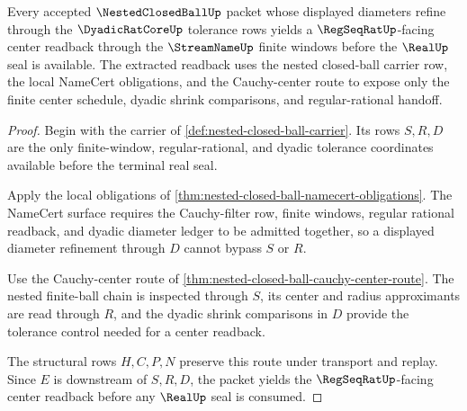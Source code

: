 \begin{theorem}
\label{thm:nestedclosedball-regseqrat-center-extraction}
Every accepted $\NestedClosedBallUp$ packet whose displayed diameters refine through the $\DyadicRatCoreUp$ tolerance rows yields a $\RegSeqRatUp$-facing center readback through the $\StreamNameUp$ finite windows before the $\RealUp$ seal is available. The extracted readback uses the nested closed-ball carrier row, the local NameCert obligations, and the Cauchy-center route to expose only the finite center schedule, dyadic shrink comparisons, and regular-rational handoff.
\end{theorem}
\begin{proof}
Begin with the carrier of \autoref{def:nested-closed-ball-carrier}. Its rows $S,R,D$ are the only finite-window, regular-rational, and dyadic tolerance coordinates available before the terminal real seal.

Apply the local obligations of \autoref{thm:nested-closed-ball-namecert-obligations}. The NameCert surface requires the Cauchy-filter row, finite windows, regular rational readback, and dyadic diameter ledger to be admitted together, so a displayed diameter refinement through $D$ cannot bypass $S$ or $R$.

Use the Cauchy-center route of \autoref{thm:nested-closed-ball-cauchy-center-route}. The nested finite-ball chain is inspected through $S$, its center and radius approximants are read through $R$, and the dyadic shrink comparisons in $D$ provide the tolerance control needed for a center readback.

The structural rows $H,C,P,N$ preserve this route under transport and replay. Since $E$ is downstream of $S,R,D$, the packet yields the $\RegSeqRatUp$-facing center readback before any $\RealUp$ seal is consumed.
\end{proof}

